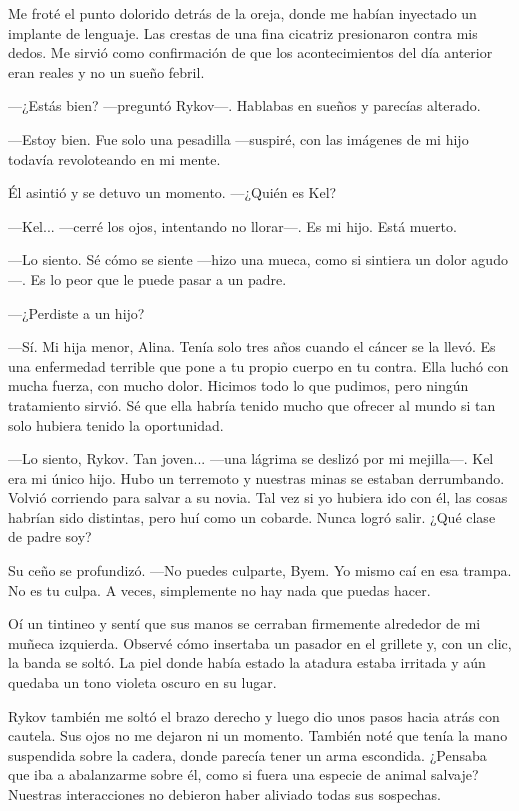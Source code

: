 Me froté el punto dolorido detrás de la oreja, donde me habían inyectado un implante de lenguaje. Las crestas de una fina cicatriz presionaron contra mis dedos. Me sirvió como confirmación de que los acontecimientos del día anterior eran reales y no un sueño febril.

—¿Estás bien? —preguntó Rykov—. Hablabas en sueños y parecías alterado.

—Estoy bien. Fue solo una pesadilla —suspiré, con las imágenes de mi hijo todavía revoloteando en mi mente.

Él asintió y se detuvo un momento. —¿Quién es Kel?

—Kel... —cerré los ojos, intentando no llorar—. Es mi hijo. Está muerto.

—Lo siento. Sé cómo se siente —hizo una mueca, como si sintiera un dolor agudo—. Es lo peor que le puede pasar a un padre.

 —¿Perdiste a un hijo?

—Sí. Mi hija menor, Alina. Tenía solo tres años cuando el cáncer se la llevó. Es una enfermedad terrible que pone a tu propio cuerpo en tu contra. Ella luchó con mucha fuerza, con mucho dolor. Hicimos todo lo que pudimos, pero ningún tratamiento sirvió. Sé que ella habría tenido mucho que ofrecer al mundo si tan solo hubiera tenido la oportunidad.

—Lo siento, Rykov. Tan joven... —una lágrima se deslizó por mi mejilla—. Kel era mi único hijo. Hubo un terremoto y nuestras minas se estaban derrumbando. Volvió corriendo para salvar a su novia. Tal vez si yo hubiera ido con él, las cosas habrían sido distintas, pero huí como un cobarde. Nunca logró salir. ¿Qué clase de padre soy?

Su ceño se profundizó. —No puedes culparte, Byem. Yo mismo caí en esa trampa. No es tu culpa. A veces, simplemente no hay nada que puedas hacer.

Oí un tintineo y sentí que sus manos se cerraban firmemente alrededor de mi muñeca izquierda. Observé cómo insertaba un pasador en el grillete y, con un clic, la banda se soltó. La piel donde había estado la atadura estaba irritada y aún quedaba un tono violeta oscuro en su lugar.

Rykov también me soltó el brazo derecho y luego dio unos pasos hacia atrás con cautela. Sus ojos no me dejaron ni un momento. También noté que tenía la mano suspendida sobre la cadera, donde parecía tener un arma escondida. ¿Pensaba que iba a abalanzarme sobre él, como si fuera una especie de animal salvaje? Nuestras interacciones no debieron haber aliviado todas sus sospechas.

